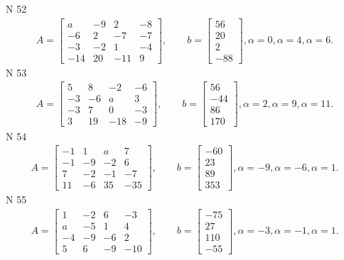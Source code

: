 \documentclass[11pt]{report}
\begin{document}
N 52
\begin{align*}
 A = \left[\begin{matrix}a & -9 & 2 & -8\\-6 & 2 & -7 & -7\\-3 & -2 & 1 & -4\\-14 & 20 & -11 & 9\end{matrix}\right],
    \qquad b = \left[\begin{matrix}56\\20\\2\\-88\end{matrix}\right], \alpha = 0, \alpha = 4, \alpha = 6. 
 \end{align*}
N 53
\begin{align*}
 A = \left[\begin{matrix}5 & 8 & -2 & -6\\-3 & -6 & a & 3\\-3 & 7 & 0 & -3\\3 & 19 & -18 & -9\end{matrix}\right],
    \qquad b = \left[\begin{matrix}56\\-44\\86\\170\end{matrix}\right], \alpha = 2, \alpha = 9, \alpha = 11. 
 \end{align*}
N 54
\begin{align*}
 A = \left[\begin{matrix}-1 & 1 & a & 7\\-1 & -9 & -2 & 6\\7 & -2 & -1 & -7\\11 & -6 & 35 & -35\end{matrix}\right],
    \qquad b = \left[\begin{matrix}-60\\23\\89\\353\end{matrix}\right], \alpha = -9, \alpha = -6, \alpha = 1. 
 \end{align*}
N 55
\begin{align*}
 A = \left[\begin{matrix}1 & -2 & 6 & -3\\a & -5 & 1 & 4\\-4 & -9 & -6 & 2\\5 & 6 & -9 & -10\end{matrix}\right],
    \qquad b = \left[\begin{matrix}-75\\27\\110\\-55\end{matrix}\right], \alpha = -3, \alpha = -1, \alpha = 1. 
 \end{align*}
\end{document}

